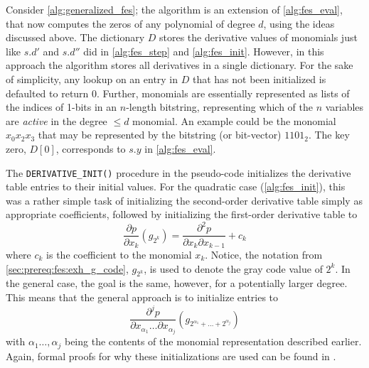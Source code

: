 Consider \cref{alg:generalized_fes}; the algorithm is an extension of \cref{alg:fes_eval}, that now computes the zeros of any polynomial of degree $d$, using the ideas discussed above. The dictionary $D$ stores the derivative values of monomials just like $s.d'$ and $s.d''$ did in \cref{alg:fes_step} and \cref{alg:fes_init}. However, in this approach the algorithm stores all derivatives in a single dictionary. For the sake of simplicity, any lookup on an entry in $D$ that has not been initialized is defaulted to return $0$. Further, monomials are essentially represented as lists of the indices of 1-bits in an $n$-length bitstring, representing which of the $n$ variables are \textit{active} in the degree $\leq d$ monomial. An example could be the monomial $x_0x_2x_3$ that may be represented by the bitstring (or bit-vector) $1101_2$. The key zero, $D[0]$, corresponds to $s.y$ in \cref{alg:fes_eval}.


The \texttt{DERIVATIVE\_INIT()} procedure in the pseudo-code initializes the derivative table entries to their initial values. For the quadratic case (\cref{alg:fes_init}), this was a rather simple task of initializing the second-order derivative table simply as appropriate coefficients, followed by initializing the first-order derivative table to 
$$
    \frac{\partial p}{\partial x_k}(g_{2^k}) = \frac{\partial^2 p}{\partial x_{k} \partial x_{k - 1}} + c_k
$$
where $c_k$ is the coefficient to the monomial $x_k$. Notice, the notation from \cref{sec:prereq:fes:exh_g_code}, $g_{2^k}$, is used to denote the gray code value of $2^k$. In the general case, the goal is the same, however, for a potentially larger degree. This means that the general approach is to initialize entries to 
$$
    \frac{\partial^j p}{\partial x_{\alpha_1} \dots \partial x_{\alpha_j}}(g_{2^{\alpha_1} + \dots + 2^{\alpha_j}})
$$
with $\alpha_1 \dots, \alpha_j$ being the contents of the monomial representation described earlier. Again, formal proofs for why these initializations are used can be found in \cite{tungchoumasters}.

